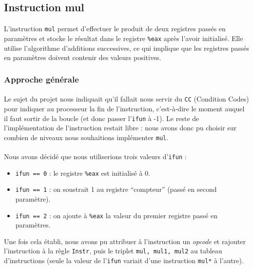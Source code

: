 \documentclass[12pt]{article}
\begin{document}
\subsection{Instruction mul}
\paragraph{}L'instruction \verb+mul+ permet d'effectuer le produit de deux registres passés en paramètres et stocke le résultat dans le registre \verb+%eax+ après l'avoir initialisé. Elle utilise l'algorithme d'additions successives, ce qui implique que les registres passés en paramètres doivent contenir des valeurs positives.  

\subsubsection{Approche générale}
\paragraph{}Le sujet du projet nous indiquait qu'il fallait nous servir du \verb+CC+ (Condition Codes) pour indiquer au processeur la fin de l'instruction, c'est-à-dire le moment auquel il faut sortir de la boucle (et donc passer l'\verb+ifun+ à -1). Le reste de l'implémentation de l'instruction restait libre : nous avons donc pu choisir sur combien de niveaux nous souhaitions implémenter \verb+mul+.

\paragraph{}Nous avons décidé que nous utiliserions trois valeurs d'\verb+ifun+ :
\begin{itemize}
\item \verb+ifun == 0+ : le registre \verb+%eax+ est initialisé à 0.
\item \verb+ifun == 1+ : on soustrait 1 au registre ``compteur'' (passé en second paramètre).
\item \verb+ifun == 2+ : on ajoute à \verb+%eax+ la valeur du premier registre passé en paramètres.
\end{itemize}
Une fois cela établi, nous avons pu attribuer à l'instruction un {\itshape opcode} et rajouter l'instruction à la règle \verb+Instr+, puis le triplet \verb+mul, mul1, mul2+ au tableau d'instructions (seule la valeur de l'\verb+ifun+ variait d'une instruction \verb+mul*+ à l'autre).
\end{document}

